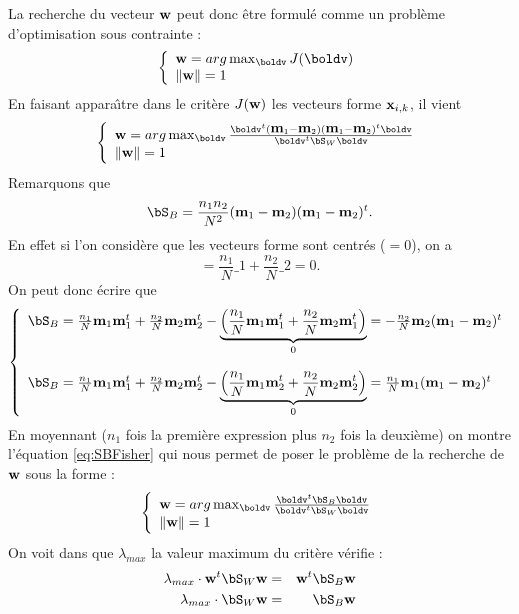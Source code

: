 La recherche du vecteur $\mbox{\bf w}$ peut donc \^etre formul\'e comme un
probl\`eme d'optimisation sous contrainte :
$$
\left \{ \begin{array}{l}
\bw = arg \max_{\boldv}  J(\boldv)  \\
\| \bw \|=1    \\
\end{array}
\right.
$$ 
En faisant appara\^{\i}tre dans le crit\`ere $J(\mbox{\bf w})$ les vecteurs forme $\mbox{\bf x}_{i,k}$,
il vient
$$
\left \{ \begin{array}{l}
\bw = arg \max_{\boldv} \frac{\boldv^t(\bm_1-\bm_2)(\bm_1-\bm_2)^t \boldv}{\boldv^t \bS_W \boldv}  \\
\| \bw \|=1    \\
\end{array}
\right.
$$ 
Remarquons que 
\begin{equation}
\label{eq:SBFisher}
\bS_B= \frac{n_1 n_2}{N^2} (\bm_1-\bm_2)(\bm_1-\bm_2)^t.
\end{equation}
En effet si l'on consid\`ere que les vecteurs forme sont centr\'es ($\bm=0$),
on a 
$$
\bm=\frac{n_1}{N}\bm_1 +  \frac{n_2}{N}\bm_2=0.
$$
On peut donc \'ecrire que 
$$
\left \{ \begin{array}{l}
\bS_B = \frac{n_1}{N} \bm_1 \bm_1^t +  \frac{n_2}{N} \bm_2 \bm_2^t - 
       \underbrace{\left ( \frac{n_1}{N} \bm_1 \bm_1^t +  \frac{n_2}{N} \bm_2 \bm_1^t    \right )}_0 = -\frac{n_2}{N}\bm_2 (\bm_1 - \bm_2)^t \\
\\
\bS_B = \frac{n_1}{N} \bm_1 \bm_1^t +  \frac{n_2}{N} \bm_2 \bm_2^t - 
       \underbrace{\left ( \frac{n_1}{N} \bm_1 \bm_2^t +  \frac{n_2}{N} \bm_2 \bm_2^t    \right )}_0 = \frac{n_1}{N}\bm_1 (\bm_1 - \bm_2)^t  \\ 
\end{array}
\right.
$$
En moyennant ($n_1$ fois la premi\`ere expression plus $n_2$ fois la deuxi\`eme) on montre l'\'equation \ref{eq:SBFisher} qui nous permet de poser
le probl\`eme de la recherche de $\mbox{\bf w}$ sous la forme : 
$$
\left \{ \begin{array}{l}
\bw = arg \max_{\boldv} \frac{\boldv^t \bS_B  \boldv}{\boldv^t \bS_W \boldv}  \\
\| \bw \|=1    \\
\end{array}
\right.
$$ 
On voit dans que $\lambda_{max}$ la valeur maximum du crit\`ere v\'erifie :
\begin{eqnarray*}
\lambda_{max} \cdot \bw^t \bS_W \bw & = &  \bw^t \bS_B \bw \\
\lambda_{max} \cdot \bS_W \bw& = &  \bS_B \bw
\end{eqnarray*}
